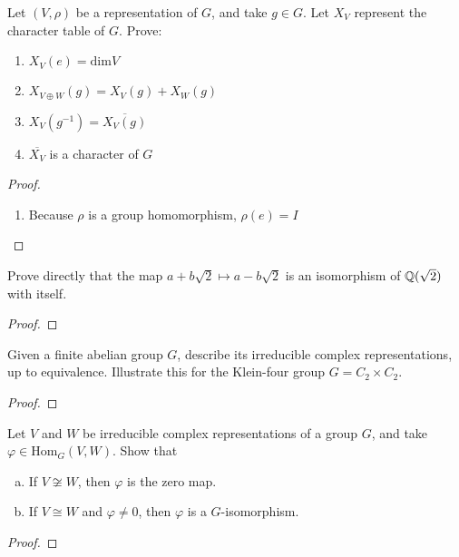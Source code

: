 \documentclass[num=5,duedate=03-10-21,course=Algebra\ II,proflastname=Walton]{hwtemplate}
\begin{document}
\problem[2]
\begin{claim} %
	Let \((V,\rho )\) be a representation of \(G\), and take \(g \in G\). Let \(X_V\) represent the character table of \(G\). Prove:
	\begin{enumerate}
		\item \(X_V(e) = \textrm{dim}V\)
		\item \(X_{V\oplus W}(g) = X_V(g) + X_W(g)\)
		\item \(X_V(g^{-1}) = \overline{X_V(g)}\)
		\item \(\overline{X_V}\) is a character of \(G\)
	\end{enumerate}
\end{claim}
\begin{proof}
	\begin{enumerate}
		\item Because \(\rho \) is a group homomorphism, \(\rho (e) = I\)
	\end{enumerate}
\end{proof}

\problem[3] %
\begin{claim}
	Prove directly that the map \(a+b\sqrt{2} \mapsto a-b \sqrt{2} \) is an isomorphism of \(\mathbb{Q}(\sqrt{2} )\) with itself.
\end{claim}
\begin{proof}
	
\end{proof}

\separator

\problem[4]
\begin{claim}
	Given a finite abelian group \(G\), describe its irreducible complex representations, up to equivalence. Illustrate this for the Klein-four group \(G = C_2 \times C_2\).
\end{claim}
\begin{proof}
	
\end{proof}

\problem[5]
\begin{claim}
	Let \(V\) and \(W\) be irreducible complex representations of a group \(G\), and take \(\varphi \in \textrm{Hom}_G(V,W)\). Show that
	\begin{enumerate}[(a).]
		\item If \(V \not\cong W\), then \(\varphi\) is the zero map.
		\item If \(V \cong W\) and \(\varphi \neq 0\), then \(\varphi \) is a \(G\)-isomorphism.
	\end{enumerate}
\end{claim}
\begin{proof}
	
\end{proof}
\end{document}
